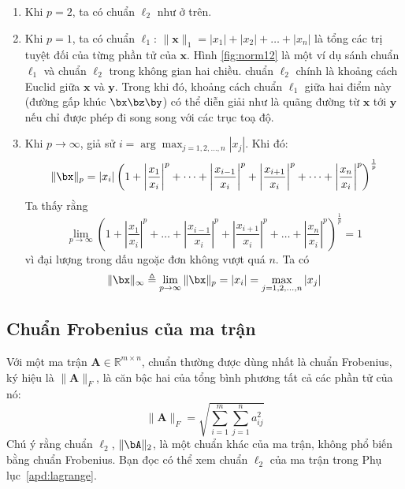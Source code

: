 \begin{enumerate}
    \item Khi $p = 2$, ta có chuẩn $\ell_2$ như ở trên.

    \item Khi $p = 1$, ta có chuẩn $\ell_1$:
    $\|\mathbf{x}\|_1 = |x_1| + |x_2| + \dots +|x_n|$ là tổng các trị tuyệt đối
    của từng phần tử của $\mathbf{x}$. Hình \ref{fig:norm12} là một ví dụ  sánh
    chuẩn $\ell_1$ và chuẩn $\ell_2$ trong không gian hai chiều. chuẩn $\ell_2$
    chính là khoảng cách Euclid giữa $\mathbf{x} $ và
    $\mathbf{y}$. Trong khi đó, khoảng cách chuẩn $\ell_1$ giữa hai điểm này
    (đường gấp khúc $\bx\bz\by$) có thể diễn giải như là quãng đường từ $\mathbf{x}
    $ tới $\mathbf{y}$ nếu chỉ được phép đi song song với các trục toạ độ. 

    \item Khi $p \rightarrow \infty $, giả sử
    $i = \arg\max_{j=1, 2, \dots, n} |x_j|$. Khi đó:
    \begin{equation}
        \|\bx\|_p = |x_i|\left(1 + \left|\frac{x_1}{x_i}\right|^p +
        \dots +
        \left|\frac{x_{i-1}}{x_i}\right|^p + \left|\frac{x_{i+1}}{x_i}\right|^p
        + \dots +\left|\frac{x_{n}}{x_i}\right|^p\right)^{\frac{1}
        {p}}
    \end{equation}
    Ta thấy rằng
    \begin{equation}
        \lim_{p \rightarrow \infty}\left(1 + \left|\frac{x_1}{x_i}\right|^p +
        \dots +
        \left|\frac{x_{i-1}}{x_i}\right|^p + \left|\frac{x_{i+1}}{x_i}\right|^p
        + \dots +\left|\frac{x_{n}}{x_i}\right|^p\right)^{\frac{1}{p}} = 1
    \end{equation}
    vì đại lượng trong dấu ngoặc đơn không vượt quá $n$. Ta có
    \begin{equation}
        \|\bx\|_{\infty} \triangleq \lim_{p \rightarrow \infty} \|\bx\|_{p} =
        |x_i| = \max_{j=1, 2, \dots, n} | x_j|
    \end{equation}

\end{enumerate}

\subsection{Chuẩn Frobenius của ma trận}
Với một ma trận $\mathbf{A} \in \mathbb{R}^{m\times n}$, chuẩn thường được dùng
nhất là chuẩn Frobenius, ký hiệu là $\|\mathbf{A}\|_F$, là căn bậc hai của tổng
bình phương tất cả các phần tử của nó:
\begin{equation*}
\|\mathbf{A}\|_F = \sqrt{\sum_{i = 1}^m \sum_{j = 1}^n a_{ij}^2}
\end{equation*}
Chú ý rằng chuẩn $\ell_2$, $\|\bA\|_2$, là một chuẩn khác của ma trận, không phổ biến bằng
chuẩn Frobenius. Bạn đọc có thể xem chuẩn $\ell_2$ của ma trận trong Phụ lục~\ref{apd:lagrange}.

